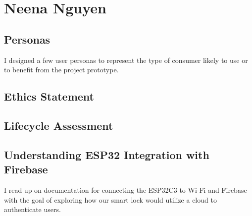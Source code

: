 \section{Neena Nguyen}

\subsection{Personas}
I designed a few user personas to represent the type of consumer likely to use or to benefit from the project prototype. 


\subsection{Ethics Statement}

\subsection{Lifecycle Assessment}

\subsection{Understanding ESP32 Integration with Firebase}
I read up on documentation for connecting the ESP32C3 to Wi-Fi and Firebase with the goal of exploring how our smart lock would utilize a cloud to authenticate users.
